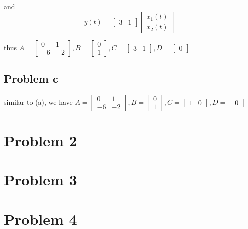 \documentclass[12pt,a4paper]{article}
\begin{document}
and
\[ y(t) = \begin{bmatrix}
        3 & 1
    \end{bmatrix} \begin{bmatrix}
                      x_1(t) \\
                      x_2(t)
                  \end{bmatrix} \]

thus
$
    A =
    \begin{bmatrix}
        0  & 1  \\
        -6 & -2
    \end{bmatrix},
    B =
    \begin{bmatrix}
        0 \\
        1
    \end{bmatrix},
    C = \begin{bmatrix}
        3 & 1
    \end{bmatrix},
    D =
    \begin{bmatrix}
        0
    \end{bmatrix}
$

\subsection{Problem c}
similar to (a), we have
$
A = \begin{bmatrix}
    0  & 1  \\
    -6 & -2
\end{bmatrix},
B = \begin{bmatrix}
    0 \\
    1
\end{bmatrix},
C = \begin{bmatrix}
    1 & 0
\end{bmatrix},
D = \begin{bmatrix}
    0
\end{bmatrix}
$


\section{Problem 2}

\section{Problem 3}

\section{Problem 4}
\end{document}

